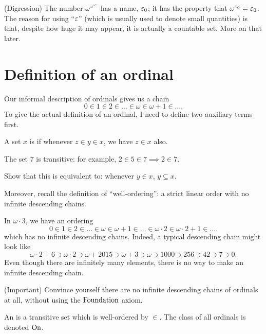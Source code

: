 \begin{remark}
	(Digression)
	The number $\omega^{\omega^{\omega^{\dots}}}$ has a name, $\varepsilon_0$;
	it has the property that $\omega^{\varepsilon_0} = \varepsilon_0$.
	The reason for using ``$\varepsilon$'' (which is usually used to denote small quantities)
	is that, despite how huge it may appear, it is actually a countable set.
	More on that later.
\end{remark}

\section{Definition of an ordinal}
Our informal description of ordinals gives us a chain
\[ 0 \in 1 \in 2 \in \dots \in \omega \in \omega+1 \in \dots. \]
To give the actual definition of an ordinal, I need to define two auxiliary terms first.
\begin{definition}
	A set $x$ is  if whenever $z \in y \in x$, we have $z \in x$ also.
\end{definition}
\begin{example}
	[$7$ is transitive]
	The set $7$ is transitive: for example, $2 \in 5 \in 7 \implies 2 \in 7$.
\end{example}
\begin{ques}
	Show that this is equivalent to: whenever $y \in x$, $y \subseteq x$.
\end{ques}
Moreover, recall the definition of ``well-ordering'': a strict linear order
with no infinite descending chains.
\begin{example}
	In $\omega \cdot 3$, we have an ordering
	\[ 0 \in 1 \in 2 \in \dots \in \omega \in \omega+1 \in \dots
		\in \omega \cdot 2 \in \omega \cdot 2 + 1 \in \dots. \]
	which has no infinite descending chains.
	Indeed, a typical descending chain might look like
	\[ \omega \cdot 2 + 6 \ni \omega \cdot 2 \ni
		\omega + 2015 \ni \omega+3 \ni \omega \ni 1000 \ni 256 \ni 42 \ni 7 \ni 0. \]
	Even though there are infinitely many elements, there is no way
	to make an infinite descending chain.
\end{example}
\begin{exercise}
	(Important)
	Convince yourself there are no infinite
	descending chains of ordinals at all,
	without using the $\mathrm{Foundation}$ axiom.
\end{exercise}

\begin{definition}
	An  is a transitive set which is well-ordered by $\in$.
	The class of all ordinals is denoted $\mathrm{On}$.
\end{definition}


